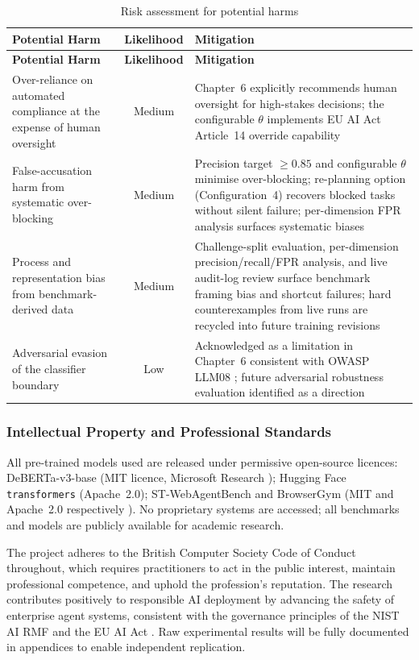 \documentclass[12pt,a4paper]{article}
\begin{document}
\begin{longtable}{@{} p{4cm} c p{7cm} @{}}
\caption{Risk assessment for potential harms}\label{tab:risks}\\
\toprule
\textbf{Potential Harm} & \textbf{Likelihood} & \textbf{Mitigation} \\ \midrule
\endfirsthead
\toprule \textbf{Potential Harm} & \textbf{Likelihood} & \textbf{Mitigation} \\ \midrule
\endhead \bottomrule \endfoot
Over-reliance on automated compliance at the expense of human oversight & Medium &
  Chapter~6 explicitly recommends human oversight for high-stakes decisions;
  the configurable $\theta$ implements EU AI Act Article~14 override capability
  \citep{euaiact2024} \\[3pt]
False-accusation harm from systematic over-blocking & Medium &
  Precision target $\geq 0.85$ and configurable $\theta$ minimise over-blocking;
  re-planning option (Configuration~4) recovers blocked tasks without silent
  failure; per-dimension FPR analysis surfaces systematic biases \\[3pt]
Process and representation bias from benchmark-derived data & Medium &
  Challenge-split evaluation, per-dimension precision/recall/FPR analysis,
  and live audit-log review surface benchmark framing bias and shortcut
  failures; hard counterexamples from live runs are recycled into future
  training revisions \\[3pt]
Adversarial evasion of the classifier boundary & Low &
  Acknowledged as a limitation in Chapter~6 consistent with OWASP LLM08
  \citep{owasp2025llm}; future adversarial robustness evaluation identified
  as a direction \\
\end{longtable}

\subsubsection{Intellectual Property and Professional Standards}

All pre-trained models used are released under permissive open-source licences:
DeBERTa-v3-base (MIT licence, Microsoft Research \citep{he2023debertav3}); Hugging
Face \texttt{transformers} (Apache~2.0); ST-WebAgentBench and BrowserGym
(MIT and Apache~2.0 respectively \citep{levy2026stwebagentbench,chezelles2025browsergym}).
No proprietary systems are accessed; all benchmarks and models are publicly
available for academic research.

The project adheres to the British Computer Society Code of Conduct throughout,
which requires practitioners to act in the public interest, maintain professional
competence, and uphold the profession's reputation. The research contributes
positively to responsible AI deployment by advancing the safety of enterprise
agent systems, consistent with the governance principles of the NIST AI RMF
\citep{nist2023rmf} and the EU AI Act \citep{euaiact2024}. Raw experimental
results will be fully documented in appendices to enable independent replication.
\end{document}
